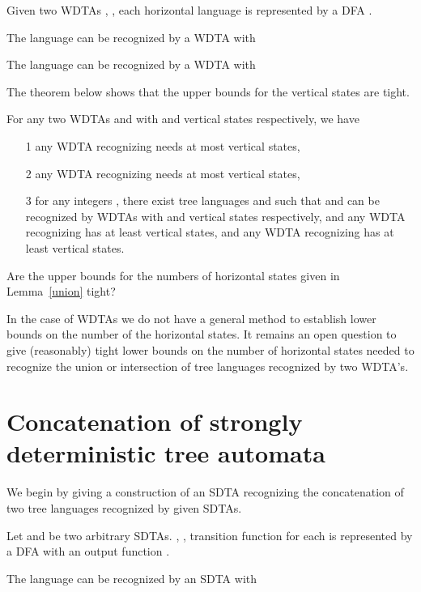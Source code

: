 \documentclass[copyright]{eptcs}
\begin{document}
\begin{lemma}\label{union}
Given two WDTAs , , each
horizontal language  is represented by a DFA
.

The language  can be recognized by a WDTA
 with


The language  can be recognized by a WDTA
 with 
\end{lemma}
The theorem below shows that the upper bounds for the vertical
states are tight.

\begin{theorem}\label{dtadfa}
For any two WDTAs  and  with  and  vertical states
respectively, we have
\begin{itemize}
  \item[1] any WDTA recognizing  needs at
  most  vertical states,
  \item[2] any WDTA recognizing  needs at
  most  vertical states,
  \item[3] for any integers , there exist tree languages 
  and  such that  and  can be recognized by
  WDTAs with  and  vertical states respectively, and any WDTA
  recognizing  has at least  vertical
  states, and any WDTA recognizing  has at least  vertical
  states.
\end{itemize}
\end{theorem}


\begin{problem}
Are the upper bounds for the numbers of horizontal states given in
Lemma~\ref{union} tight?
\end{problem}
In the case of WDTAs we do not have
a general method to establish lower bounds on the number of the horizontal states.
It remains an open question to give (reasonably) tight lower
bounds on the number of horizontal states needed to recognize the
union or intersection of tree languages recognized by two WDTA's.
\section{Concatenation of strongly deterministic tree automata}\label{con}

We begin by  giving a construction of an SDTA recognizing the
concatenation of two tree languages recognized by given
 SDTAs.

\begin{lemma}\label{cons}
Let  and  be two arbitrary SDTAs.
, , transition function for
each  is represented by a DFA
 with an output
function .

The language  can be recognized by an SDTA 
with

\end{lemma}
\end{document}
